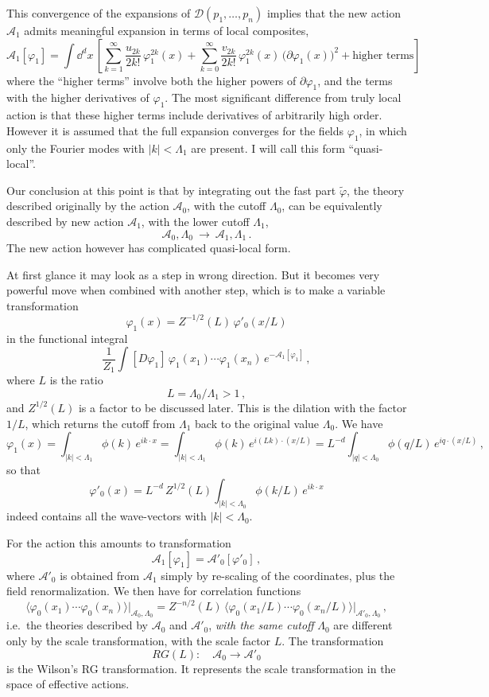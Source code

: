 This convergence of the expansions of $\mathcal D(p_1,\dots,p_n)$ implies that the
new action $\mathcal A_1$ admits meaningful expansion in terms of local
composites,
\[
\mathcal A_1[\varphi_1]=\int \dd^dx\,\left[\sum_{k=1}^\infty\frac{u_{2k}}{2k!}\,\varphi_1^{2k}(x)+\sum_{k=0}^\infty\frac{v_{2k}}{2k!}\,\varphi_1^{2k}(x)\,\bigl(\partial\varphi_1(x)\bigr)^2+\text{higher terms}\right]
\]
where the ``higher terms'' involve both the higher powers of $\partial\varphi_1$,
and the terms with the higher derivatives of $\varphi_1$. The most significant
difference from truly local action is that these higher terms include derivatives
of arbitrarily high order. However it is assumed that the full expansion
converges for the fields $\varphi_1$, in which only the Fourier modes with
$|k|<\Lambda_1$ are present. I will call this form ``quasi-local''.

Our conclusion at this point is that by integrating out the fast part
$\tilde\varphi$, the theory described originally by the action $\mathcal A_0$,
with the cutoff $\Lambda_0$, can be equivalently described by new action
$\mathcal A_1$, with the lower cutoff $\Lambda_1$,
\[
\mathcal A_0,\Lambda_0\ \to\ \mathcal A_1,\Lambda_1\,.
\]
The new action however has complicated quasi-local form.

At first glance it may look as a step in wrong direction. But it becomes very
powerful move when combined with another step, which is to make a variable
transformation
\[
\varphi_1(x)=Z^{-1/2}(L)\,\varphi'_0(x/L)
\]
in the functional integral
\[
\frac1{Z_1}\int[D\varphi_1]\,\varphi_1(x_1)\cdots\varphi_1(x_n)\,e^{-\mathcal A_1[\varphi_1]}\,,
\]
where $L$ is the ratio
\[
L=\Lambda_0/\Lambda_1>1\,,
\]
and $Z^{1/2}(L)$ is a factor to be discussed later. This is the dilation with the
factor $1/L$, which returns the cutoff from $\Lambda_1$ back to the original value
$\Lambda_0$. We have
\[
\varphi_1(x)=\int_{|k|<\Lambda_1}\phi(k)\,e^{ik\cdot x}=\int_{|k|<\Lambda_1}\phi(k)\,e^{i(Lk)\cdot(x/L)}=L^{-d}\int_{|q|<\Lambda_0}\phi(q/L)\,e^{iq\cdot(x/L)}\,,
\]
so that
\[
\varphi'_0(x)=L^{-d}\,Z^{1/2}(L)\int_{|k|<\Lambda_0}\phi(k/L)\,e^{ik\cdot x}
\]
indeed contains all the wave-vectors with $|k|<\Lambda_0$.

For the action this amounts to transformation
\[
\mathcal A_1[\varphi_1]=\mathcal A'_0[\varphi'_0]\,,
\]
where $\mathcal A'_0$ is obtained from $\mathcal A_1$ simply by re-scaling of the
coordinates, plus the field renormalization. We then have for correlation
functions
\[
\bigl\langle\varphi_0(x_1)\cdots\varphi_0(x_n)\bigr\rangle\Big|_{\mathcal A_0,\Lambda_0}
=Z^{-n/2}(L)\,\bigl\langle\varphi_0(x_1/L)\cdots\varphi_0(x_n/L)\bigr\rangle\Big|_{\mathcal A'_0,\Lambda_0}\,,
\]
i.e.\ the theories described by $\mathcal A_0$ and $\mathcal A'_0$, \emph{with the
same cutoff} $\Lambda_0$ are different only by the scale transformation, with the
scale factor $L$. The transformation
\[
RG(L):\quad\mathcal A_0\to\mathcal A'_0
\]
is the Wilson's RG transformation. It represents the scale transformation in the
space of effective actions.
